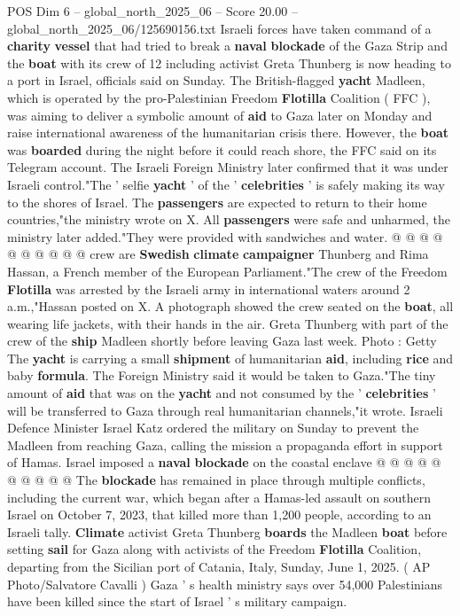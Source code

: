 \begin{textsample}{POS Dim 6 – global\_north\_2025\_06 – Score 20.00 – global\_north\_2025\_06/125690156.txt}  \label{ex:f6_pos_021}
Israeli forces have taken command of a \textbf{charity} \textbf{vessel} that had tried to break a \textbf{naval} \textbf{blockade} of the Gaza Strip and the \textbf{boat} with its crew of 12 including activist Greta Thunberg is now heading to a port in Israel, officials said on Sunday.
The British-flagged \textbf{yacht} Madleen, which is operated by the pro-Palestinian Freedom \textbf{Flotilla} Coalition ( FFC ), was aiming to deliver a symbolic amount of \textbf{aid} to Gaza later on Monday and raise international awareness of the humanitarian crisis there.
However, the \textbf{boat} was \textbf{boarded} during the night before it could reach shore, the FFC said on its Telegram account.
The Israeli Foreign Ministry later confirmed that it was under Israeli control."The ' selfie \textbf{yacht} ' of the ' \textbf{celebrities} ' is safely making its way to the shores of Israel.
The \textbf{passengers} are expected to return to their home countries,"the ministry wrote on X.
All \textbf{passengers} were safe and unharmed, the ministry later added."They were provided with sandwiches and water. @ @ @ @ @ @ @ @ @ @ crew are \textbf{Swedish} \textbf{climate} \textbf{campaigner} Thunberg and Rima Hassan, a French member of the European Parliament."The crew of the Freedom \textbf{Flotilla} was arrested by the Israeli army in international waters around 2 a.m.,"Hassan posted on X.
A photograph showed the crew seated on the \textbf{boat}, all wearing life jackets, with their hands in the air.
Greta Thunberg with part of the crew of the \textbf{ship} Madleen shortly before leaving Gaza last week.
Photo : Getty The \textbf{yacht} is carrying a small \textbf{shipment} of humanitarian \textbf{aid}, including \textbf{rice} and baby \textbf{formula}.
The Foreign Ministry said it would be taken to Gaza."The tiny amount of \textbf{aid} that was on the \textbf{yacht} and not consumed by the ' \textbf{celebrities} ' will be transferred to Gaza through real humanitarian channels,"it wrote.
Israeli Defence Minister Israel Katz ordered the military on Sunday to prevent the Madleen from reaching Gaza, calling the mission a propaganda effort in support of Hamas.
Israel imposed a \textbf{naval} \textbf{blockade} on the coastal enclave @ @ @ @ @ @ @ @ @ @ The \textbf{blockade} has remained in place through multiple conflicts, including the current war, which began after a Hamas-led assault on southern Israel on October 7, 2023, that killed more than 1,200 people, according to an Israeli tally. \textbf{Climate} activist Greta Thunberg \textbf{boards} the Madleen \textbf{boat} before setting \textbf{sail} for Gaza along with activists of the Freedom \textbf{Flotilla} Coalition, departing from the Sicilian port of Catania, Italy, Sunday, June 1, 2025. ( AP Photo/Salvatore Cavalli ) Gaza ' s health ministry says over 54,000 Palestinians have been killed since the start of Israel ' s military campaign.

\end{textsample}
